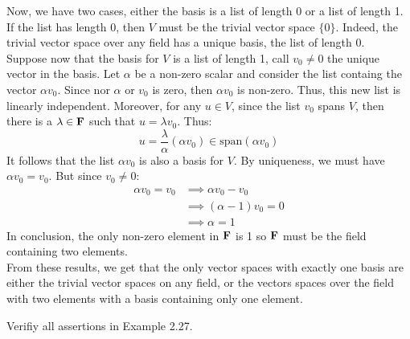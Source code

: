 \begin{solution}
    Now, we have two cases, either the basis is a list of length 0 or a list of length 1. If the list has length 0, then $V$ must be the trivial vector space $\{0\}$. Indeed, the trivial vector space over any field has a unique basis, the list of length 0. \\
    Suppose now that the basis for $V$ is a list of length 1, call $v_0 \neq 0$ the unique vector in the basis. Let $\alpha$ be a non-zero scalar and consider the list containg the vector $\alpha v_0$. Since nor $\alpha$ or $v_0$ is zero, then $\alpha v_0$ is non-zero. Thus, this new list is linearly independent. Moreover, for any $u \in V$, since the list $v_0$ spans $V$, then there is a $\lambda \in \mathbf{F}$ such that $u = \lambda v_0$. Thus:
    $$u = \frac{\lambda}{\alpha}(\alpha v_0) \in \text{span}(\alpha v_0)$$
    It follows that the list $\alpha v_0$ is also a basis for $V$. By uniqueness, we must have $\alpha v_0 = v_0$. But since $v_0 \neq 0$:
    \begin{align*}
        \alpha v_0 = v_0 &\implies \alpha v_0 - v_0 \\
        &\implies (\alpha - 1)v_0 = 0 \\
        &\implies \alpha = 1
    \end{align*}
    In conclusion, the only non-zero element in $\mathbf{F}$ is 1 so $\mathbf{F}$ must be the field containing two elements. \\
    From these results, we get that the only vector spaces with exactly one basis are either the trivial vector spaces on any field, or the vectors spaces over the field with two elements with a basis containing only one element.\\ 
\end{solution}

\begin{exercise}
    Verifiy all assertions in Example 2.27. \\
\end{exercise}

